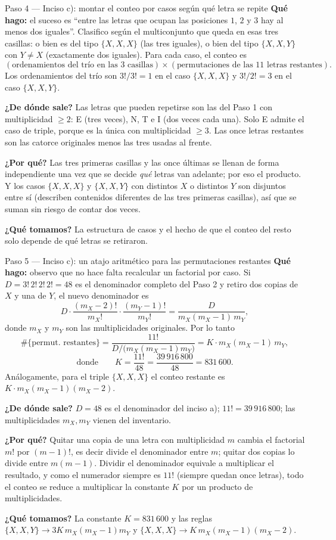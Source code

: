 \documentclass[11pt]{article}
\begin{document}
\begin{paso}{Paso 4 --- Inciso c): montar el conteo por casos según qué letra se repite}
\textbf{Qué hago:} el suceso es ``entre las letras que ocupan las posiciones $1$, $2$ y $3$ hay al menos
dos iguales''. Clasifico según el multiconjunto que queda en esas tres casillas: o bien es del tipo
$\{X,X,X\}$ (las tres iguales), o bien del tipo $\{X,X,Y\}$ con $Y\neq X$ (exactamente dos iguales). Para
cada caso, el conteo es
\[
(\text{ordenamientos del trío en las 3 casillas})\times(\text{permutaciones de las 11 letras restantes}).
\]
Los ordenamientos del trío son $3!/3!=1$ en el caso $\{X,X,X\}$ y $3!/2!=3$ en el caso $\{X,X,Y\}$.

\textbf{¿De dónde sale?} Las letras que pueden repetirse son las del Paso 1 con multiplicidad
$\geq 2$: E (tres veces), N, T e I (dos veces cada una). Solo E admite el caso de triple, porque es la
única con multiplicidad $\geq 3$. Las once letras restantes son las catorce originales menos las tres
usadas al frente.

\textbf{¿Por qué?} Las tres primeras casillas y las once últimas se llenan de forma independiente una vez
que se decide \emph{qué} letras van adelante; por eso el producto. Y los casos $\{X,X,X\}$ y $\{X,X,Y\}$
con distintos $X$ o distintos $Y$ son disjuntos entre sí (describen contenidos diferentes de las tres
primeras casillas), así que se suman sin riesgo de contar dos veces.

\textbf{¿Qué tomamos?} La estructura de casos y el hecho de que el conteo del resto solo depende de qué
letras se retiraron.
\end{paso}

\begin{paso}{Paso 5 --- Inciso c): un atajo aritmético para las permutaciones restantes}
\textbf{Qué hago:} observo que no hace falta recalcular un factorial por caso. Si $D=3!\,2!\,2!\,2!=48$ es
el denominador completo del Paso 2 y retiro dos copias de $X$ y una de $Y$, el nuevo denominador es
\[
D\cdot\frac{(m_X-2)!}{m_X!}\cdot\frac{(m_Y-1)!}{m_Y!}=\frac{D}{m_X(m_X-1)\,m_Y},
\]
donde $m_X$ y $m_Y$ son las multiplicidades originales. Por lo tanto
\[
\#\{\text{permut. restantes}\}=\frac{11!}{D/\big(m_X(m_X-1)m_Y\big)}=K\cdot m_X(m_X-1)\,m_Y,
\]
\[
\text{donde}\qquad K=\frac{11!}{48}=\frac{39\,916\,800}{48}=831\,600 .
\]
Análogamente, para el triple $\{X,X,X\}$ el conteo restante es $K\cdot m_X(m_X-1)(m_X-2)$.

\textbf{¿De dónde sale?} $D=48$ es el denominador del inciso a); $11!=39\,916\,800$; las multiplicidades
$m_X,m_Y$ vienen del inventario.

\textbf{¿Por qué?} Quitar una copia de una letra con multiplicidad $m$ cambia el factorial $m!$ por
$(m-1)!$, es decir divide el denominador entre $m$; quitar dos copias lo divide entre $m(m-1)$. Dividir el
denominador equivale a multiplicar el resultado, y como el numerador siempre es $11!$ (siempre quedan once
letras), todo el conteo se reduce a multiplicar la constante $K$ por un producto de multiplicidades.

\textbf{¿Qué tomamos?} La constante $K=831\,600$ y las reglas
$\{X,X,Y\}\to 3K\,m_X(m_X-1)m_Y$ y $\{X,X,X\}\to K\,m_X(m_X-1)(m_X-2)$.
\end{paso}
\end{document}
